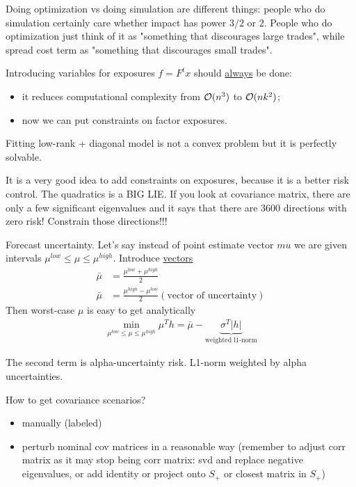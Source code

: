 \begin{idea}
	Doing optimization vs doing simulation are different things: people who do simulation certainly care whether impact has power $3/2$ or $2$. People who do optimization just think of it as "something that discourages large trades", while spread cost term as "something that discourages small trades".
\end{idea}

\begin{idea}
	Introducing variables for exposures $f = F^t x$ should \underline{always} be done:
	\begin{itemize}
		\item it reduces computational complexity from $\mathcal{O}(n^3)$ to $\mathcal{O}(n k^2)$;
		\item now we can put constraints on factor exposures.
	\end{itemize}
\end{idea}

\begin{idea}
	Fitting low-rank + diagonal model is not a convex problem but it is perfectly solvable.
\end{idea}

\begin{idea}
	It is a very good idea to add constraints on exposures, because it is a better risk control. The quadratics is a BIG LIE. If you look at covariance matrix, there are only a few significant eigenvalues and it says that there are 3600 directions with zero risk! Constrain those directions!!!
\end{idea}

\begin{idea}
	Forecast uncertainty. Let's say instead of point estimate vector $mu$ we are given intervals $\mu^{low} \le \mu \le \mu^{high}$. Introduce \underline{vectors}
	\begin{align}
		\bar{\mu} &= \frac{\mu^{low}+\mu^{high}}{2} \\ 
		\bar{\mu} &= \frac{\mu^{high}-\mu^{low}}{2} (\text{vector of uncertainty})
	\end{align}
	Then worst-case $\mu$ is easy to get analytically
	\begin{align}
		\min_{\mu^{low} \le \mu \le \mu^{high}} \mu^T h = \bar{\mu} - \underbrace{\sigma^T |h|}_{\text{weighted l1-norm}}
	\end{align}

The second term is alpha-uncertainty risk. L1-norm weighted by alpha uncertainties.

\end{idea}

\begin{idea}
	How to get covariance scenarios?
	\begin{itemize}
		\item manually (labeled)
		\item perturb nominal cov matrices in a reasonable way (remember to adjust corr matrix as it may stop being corr matrix: svd and replace negative eigenvalues, or add identity or project onto $S_+$ or closest matrix in $S_+$)
	\end{itemize}
\end{idea}